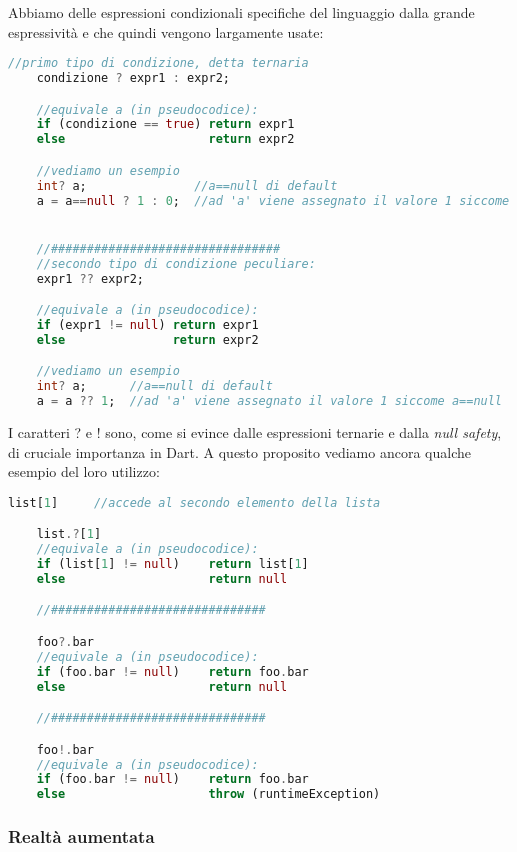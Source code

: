 Abbiamo delle espressioni condizionali specifiche del linguaggio dalla grande espressività e che quindi vengono largamente usate:
\begin{lstlisting}[language=dart, firstnumber=1,caption={Dart \textit{null safety}}]
    //primo tipo di condizione, detta ternaria
    condizione ? expr1 : expr2;

    //equivale a (in pseudocodice):
    if (condizione == true) return expr1
    else                    return expr2

    //vediamo un esempio
    int? a;               //a==null di default
    a = a==null ? 1 : 0;  //ad 'a' viene assegnato il valore 1 siccome a==null


    //################################
    //secondo tipo di condizione peculiare:
    expr1 ?? expr2;

    //equivale a (in pseudocodice):
    if (expr1 != null) return expr1
    else               return expr2

    //vediamo un esempio
    int? a;      //a==null di default
    a = a ?? 1;  //ad 'a' viene assegnato il valore 1 siccome a==null
\end{lstlisting}

I caratteri ? e ! sono, come si evince dalle espressioni ternarie e dalla \textit{null safety}, di cruciale importanza in Dart. A questo proposito vediamo ancora qualche esempio del loro utilizzo:
\begin{lstlisting}[language=dart, firstnumber=1,caption={Dart \textit{null safety}}]
    list[1]     //accede al secondo elemento della lista

    list.?[1]
    //equivale a (in pseudocodice):
    if (list[1] != null)    return list[1]
    else                    return null

    //##############################

    foo?.bar 
    //equivale a (in pseudocodice):
    if (foo.bar != null)    return foo.bar
    else                    return null

    //##############################

    foo!.bar
    //equivale a (in pseudocodice):
    if (foo.bar != null)    return foo.bar
    else                    throw (runtimeException)
\end{lstlisting}


\subsubsection{Realtà aumentata}
